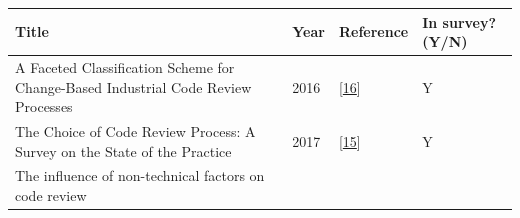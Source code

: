 \documentclass[]{book}
\begin{document}
\begin{longtable}[]{@{}llll@{}}
\toprule
\begin{minipage}[b]{0.56\columnwidth}\raggedright\strut
Title\strut
\end{minipage} & \begin{minipage}[b]{0.04\columnwidth}\raggedright\strut
Year\strut
\end{minipage} & \begin{minipage}[b]{0.16\columnwidth}\raggedright\strut
Reference\strut
\end{minipage} & \begin{minipage}[b]{0.12\columnwidth}\raggedright\strut
In survey? (Y/N)\strut
\end{minipage}\tabularnewline
\midrule
\endhead
\begin{minipage}[t]{0.56\columnwidth}\raggedright\strut
A Faceted Classification Scheme for Change-Based Industrial Code Review
Processes\strut
\end{minipage} & \begin{minipage}[t]{0.04\columnwidth}\raggedright\strut
2016\strut
\end{minipage} & \begin{minipage}[t]{0.16\columnwidth}\raggedright\strut
{[}\protect\hyperlink{ref-baum2016faceted}{16}{]}\strut
\end{minipage} & \begin{minipage}[t]{0.12\columnwidth}\raggedright\strut
Y\strut
\end{minipage}\tabularnewline
\begin{minipage}[t]{0.56\columnwidth}\raggedright\strut
The Choice of Code Review Process: A Survey on the State of the
Practice\strut
\end{minipage} & \begin{minipage}[t]{0.04\columnwidth}\raggedright\strut
2017\strut
\end{minipage} & \begin{minipage}[t]{0.16\columnwidth}\raggedright\strut
{[}\protect\hyperlink{ref-baum2017choice}{15}{]}\strut
\end{minipage} & \begin{minipage}[t]{0.12\columnwidth}\raggedright\strut
Y\strut
\end{minipage}\tabularnewline
\begin{minipage}[t]{0.56\columnwidth}\raggedright\strut
The influence of non-technical factors on code review\strut
\end{minipage} & \begin{minipage}[t]{0.04\columnwidth}\raggedright\strut

\end{minipage}
\end{longtable}
\end{document}
